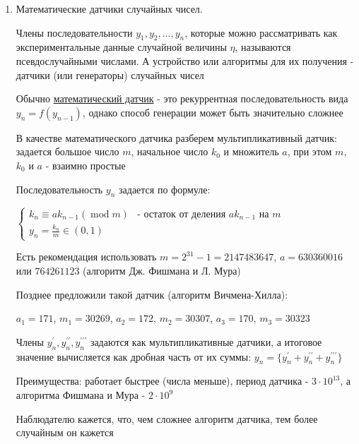 \documentclass[12pt]{article}
\begin{document}
\begin{enumerate}
    \Nota Если из теории мы знаем вид зависимости и подбираем ее под данные, то желательно строить модель как можно проще

    \Notas Из построенных моделей предпочтительней та, где коэффициент детерминации больше

    \item Математические датчики случайных чисел.

    \Def Члены последовательности $y_1, y_2, \dots, y_n$, которые можно рассматривать как экспериментальные данные случайной величины $\eta$, называются псевдослучайными числами. А устройство или алгоритмы для их получения - датчики (или генераторы) случайных чисел

    Обычно \hyperlink{mathematical_rng}{математический датчик} - это рекуррентная последовательность вида $y_n = f(y_{n - 1})$, однако способ генерации может быть значительно сложнее

    В качестве математического датчика разберем мультипликативный датчик: задается большое число $m$, начальное число $k_0$ и множитель $a$, при этом $m$, $k_0$ и $a$ - взаимно простые

    Последовательность $y_n$ задается по формуле:

    $\begin{cases}
        k_n \equiv a k_{n - 1} (\operatorname{mod} m) & \text{- остаток от деления }ak_{n - 1}\text{ на }m \\
        y_n = \frac{k_n}{m} \in (0, 1)
    \end{cases}$

    Есть рекомендация использовать $m = 2^{31} - 1 = 2147483647$, $a = 630360016$ или $764261123$ (алгоритм Дж. Фишмана и Л. Мура)

    Позднее предложили такой датчик (алгоритм Вичмена-Хилла):

    $a_1 = 171$, $m_1 = 30269$, $a_2 = 172$, $m_2 = 30307$, $a_3 = 170$, $m_3 = 30323$ 

    Члены $y_n^\prime, y_n^{\prime\prime}, y_n^{\prime\prime\prime}$ задаются как мультипликативные датчики, а итоговое значение вычисляется как дробная часть от их суммы: $y_n = \{y_n^\prime + y_n^{\prime\prime} + y_n^{\prime\prime\prime}\}$

    Преимущества: работает быстрее (числа меньше), период датчика - $3 \cdot 10^{13}$, а алгоритма Фишмана и Мура - $2 \cdot 10^9$

    Наблюдателю кажется, что, чем сложнее алгоритм датчика, тем более случайным он кажется


\end{enumerate}
\end{document}
